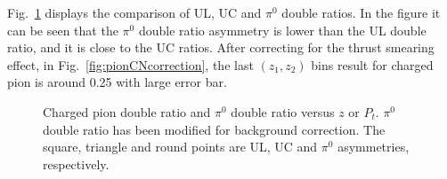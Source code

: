 Fig.~\ref{fig:pionCN} displays the comparison of UL, UC and $\pi^0$ double ratios. In the figure it can be seen that the $\pi^0$ double ratio asymmetry is lower than the UL double ratio, and it is close to the UC ratios. After correcting for the thrust smearing effect, in Fig.~\ref{fig:pionCNcorrection}, the last $(z_1,z_2)$ bins result for charged pion is around 0.25 with large error bar. 
\begin{figure}[H]
  \centering     
  \caption{Charged pion double ratio and $\pi^0$ double ratio versus $z$ or $P_t$. $\pi^0$ double ratio has been modified for background correction. The square, triangle and round points are UL, UC and $\pi^0$ asymmetries, respectively.}
\label{fig:pionCN}
\end{figure}

